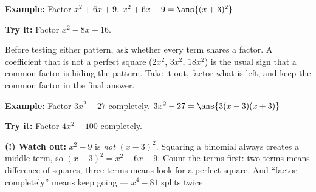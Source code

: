 \documentclass[12pt]{article}
\begin{document}
\begin{examplebox}
\textbf{Example:} Factor $x^2 + 6x + 9$.
$x^2 + 6x + 9 = \ans{(x+3)^2}$
\end{examplebox}

\begin{tryitbox}
\textbf{Try it:} Factor $x^2 - 8x + 16$.\\[2pt]
\end{tryitbox}


\begin{formulabox}
Before testing either pattern, ask whether every term shares a factor. A
coefficient that is not a perfect square ($2x^2$, $3x^2$, $18x^2$) is the usual
sign that a common factor is hiding the pattern. Take it out, factor what is
left, and keep the common factor in the final answer.
\end{formulabox}

\begin{examplebox}
\textbf{Example:} Factor $3x^2 - 27$ completely.
$3x^2 - 27 = \ans{3(x-3)(x+3)}$
\end{examplebox}

\begin{tryitbox}
\textbf{Try it:} Factor $4x^2 - 100$ completely.\\[2pt]
\end{tryitbox}

\begin{watchoutbox}
\textbf{(!) Watch out:} $x^2 - 9$ is \emph{not} $(x - 3)^2$. Squaring a binomial
always creates a middle term, so $(x - 3)^2 = x^2 - 6x + 9$. Count the terms
first: two terms means difference of squares, three terms means look for a
perfect square. And ``factor completely'' means keep going --- $x^4 - 81$
splits twice.
\end{watchoutbox}
\end{document}
